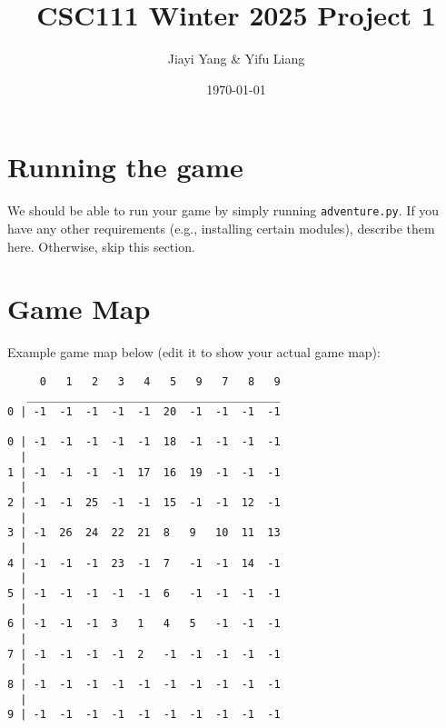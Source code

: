 \documentclass[11pt]{article}
\title{CSC111 Winter 2025 Project 1}
\author{Jiayi Yang \& Yifu Liang}
\date{\today}
\begin{document}
\maketitle

\section*{Running the game}
We should be able to run your game by simply running \texttt{adventure.py}. If you have any other requirements (e.g., installing certain modules), describe them here. Otherwise, skip this section.

\section*{Game Map}
Example game map below (edit it to show your actual game map):

\begin{verbatim}
     0   1   2   3   4   5   9   7   8   9
   _______________________________________
0 | -1  -1  -1  -1  -1  20  -1  -1  -1  -1
   
0 | -1  -1  -1  -1  -1  18  -1  -1  -1  -1
  |
1 | -1  -1  -1  -1  17  16  19  -1  -1  -1
  |
2 | -1  -1  25  -1  -1  15  -1  -1  12  -1
  |
3 | -1  26  24  22  21  8   9   10  11  13
  |
4 | -1  -1  -1  23  -1  7   -1  -1  14  -1
  |
5 | -1  -1  -1  -1  -1  6   -1  -1  -1  -1
  |
6 | -1  -1  -1  3   1   4   5   -1  -1  -1
  |
7 | -1  -1  -1  -1  2   -1  -1  -1  -1  -1
  |
8 | -1  -1  -1  -1  -1  -1  -1  -1  -1  -1
  |
9 | -1  -1  -1  -1  -1  -1  -1  -1  -1  -1

\end{verbatim}
\end{document}
